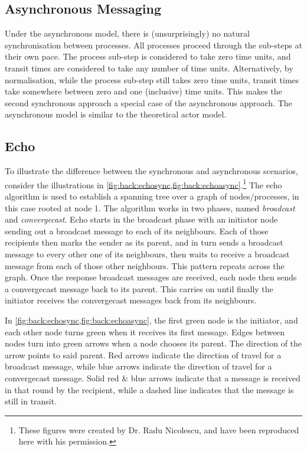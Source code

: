 \subsection{Asynchronous Messaging}
Under the asynchronous model, there is (unsurprisingly) no natural synchronisation between processes.  All processes proceed through the sub-steps at their own pace.  The \textsf{process} sub-step is considered to take zero time units, and transit times are considered to take any number of time units.  Alternatively, by normalisation, while the \textsf{process} sub-step still takes zero time units, transit times take somewhere between zero and one (inclusive) time units.  This makes the second synchronous approach a special case of the asynchronous approach.  The asynchronous model is similar to the theoretical \gls{actor} model.

\subsection{Echo}
To illustrate the difference between the synchronous and asynchronous scenarios, consider the illustrations in \cref{fig:back:echosync,fig:back:echoasync}.\footnote{These figures were created by Dr. Radu Nicolescu, and have been reproduced here with his permission.}  The \textsf{echo} algorithm \cite[Ch.~4.3]{Fokkink2013} is used to establish a spanning tree over a graph of nodes/processes, in this case rooted at node 1.  The algorithm works in two phases, named \emph{broadcast} and \emph{convergecast}.  \textsf{Echo} starts in the broadcast phase with an initiator node sending out a broadcast message to each of its neighbours.  Each of those recipients then marks the sender as its parent, and in turn sends a broadcast message to every other one of its neighbours, then waits to receive a broadcast message from each of those other neighbours.  This pattern repeats across the graph.  Once the response broadcast messages are received, each node then sends a convergecast message back to its parent.  This carries on until finally the initiator receives the convergecast messages back from its neighbours.

In \cref{fig:back:echosync,fig:back:echoasync}, the first green node is the initiator, and each other node turns green when it receives its first message.  Edges between nodes turn into green arrows when a node chooses its parent.  The direction of the arrow points to said parent.  Red arrows indicate the direction of travel for a broadcast message, while blue arrows indicate the direction of travel for a convergecast message.  Solid red \& blue arrows indicate that a message is received in that round by the recipient, while a dashed line indicates that the message is still in transit.

